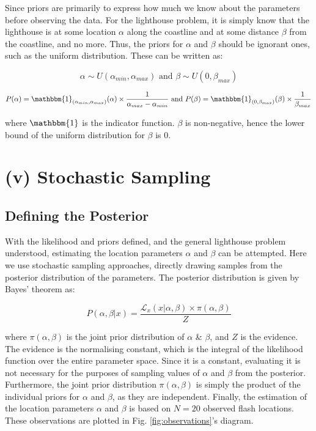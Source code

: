 \documentclass[12pt]{report} %
\begin{document}
Since priors are primarily to express how much we know about the parameters before observing the data. For the lighthouse problem, it is simply know that the lighthouse is at some location $\alpha$ along the coastline and at some distance $\beta$ from the coastline, and no more. Thus, the priors for $\alpha$ and $\beta$ should be ignorant ones, such as the uniform distribution. These can be written as:

\begin{equation}
    \alpha \sim U(\alpha_{min}, \alpha_{max}) \text{ and } \beta \sim U(0, \beta_{max})
\end{equation}

\begin{equation}
    P(\alpha) = \mathbbm{1}_{(\alpha_{min}, \alpha_{max})}(\alpha) \times \frac{1}{\alpha_{max} - \alpha_{min}} \text{ and } P(\beta) = \mathbbm{1}_{(0, \beta_{max})}(\beta) \times \frac{1}{\beta_{max}}
\end{equation}

where $\mathbbm{1}$ is the indicator function. $\beta$ is non-negative, hence the lower bound of the uniform distribution for $\beta$ is 0.


\section*{(v) Stochastic Sampling }

\subsection*{Defining the Posterior}

With the likelihood and priors defined, and the general lighthouse problem understood, estimating the location parameters $\alpha$ and $\beta$ can be attempted. Here we use stochastic sampling approaches, directly drawing samples from the posterior distribution of the parameters. The posterior distribution is given by Bayes' theorem as:

\begin{equation}
    P(\alpha, \beta | x) = \frac{\mathcal{L}_{x}(x | \alpha, \beta) \times \pi(\alpha,\beta)}{Z}
\end{equation}

where $\pi(\alpha,\beta)$ is the joint prior distribution of $\alpha$ \& $\beta$, and $Z$ is the evidence. The evidence is the normalising constant, which is the integral of the likelihood function over the entire parameter space. Since it is a constant, evaluating it is not necessary for the purposes of sampling values of $\alpha$ and $\beta$ from the posterior. Furthermore, the joint prior distribution $\pi(\alpha,\beta)$ is simply the product of the individual priors for $\alpha$ and $\beta$, as they are independent. Finally, the estimation of the location parameters $\alpha$ and $\beta$ is based on $N = 20$ observed flash locations. These observations are plotted in Fig. \ref{fig:observations}'s diagram.
\end{document}
